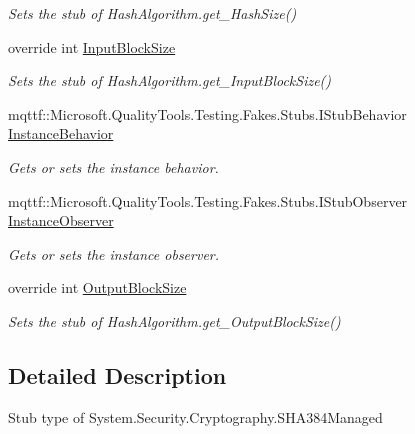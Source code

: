 \begin{DoxyCompactItemize}
\begin{DoxyCompactList}\small\item\em Sets the stub of Hash\-Algorithm.\-get\-\_\-\-Hash\-Size()\end{DoxyCompactList}\item 
override int \hyperlink{class_system_1_1_security_1_1_cryptography_1_1_fakes_1_1_stub_s_h_a384_managed_acf4da7ddffaec0f17b43630ca2b11a39}{Input\-Block\-Size}
\begin{DoxyCompactList}\small\item\em Sets the stub of Hash\-Algorithm.\-get\-\_\-\-Input\-Block\-Size()\end{DoxyCompactList}\item 
mqttf\-::\-Microsoft.\-Quality\-Tools.\-Testing.\-Fakes.\-Stubs.\-I\-Stub\-Behavior \hyperlink{class_system_1_1_security_1_1_cryptography_1_1_fakes_1_1_stub_s_h_a384_managed_a583b0152f84550c3fab006897cfcd73b}{Instance\-Behavior}
\begin{DoxyCompactList}\small\item\em Gets or sets the instance behavior.\end{DoxyCompactList}\item 
mqttf\-::\-Microsoft.\-Quality\-Tools.\-Testing.\-Fakes.\-Stubs.\-I\-Stub\-Observer \hyperlink{class_system_1_1_security_1_1_cryptography_1_1_fakes_1_1_stub_s_h_a384_managed_a6ab8538ef0a80e20beab33603e18b2f8}{Instance\-Observer}
\begin{DoxyCompactList}\small\item\em Gets or sets the instance observer.\end{DoxyCompactList}\item 
override int \hyperlink{class_system_1_1_security_1_1_cryptography_1_1_fakes_1_1_stub_s_h_a384_managed_a3db7c98fd3e00e9679308ceca4216bb3}{Output\-Block\-Size}
\begin{DoxyCompactList}\small\item\em Sets the stub of Hash\-Algorithm.\-get\-\_\-\-Output\-Block\-Size()\end{DoxyCompactList}\end{DoxyCompactItemize}


\subsection{Detailed Description}
Stub type of System.\-Security.\-Cryptography.\-S\-H\-A384\-Managed



